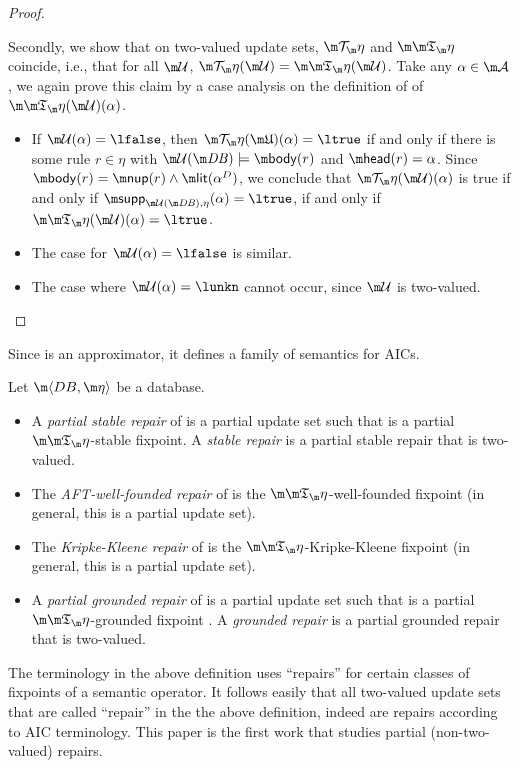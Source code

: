 \begin{proof}
\begin{itemize}
\end{itemize}

Secondly, we show that on two-valued update sets, $\Op$ and $\Ap$ coincide, i.e., that for all $\UU$, $\Op(\UU) =  \Ap(\UU)$. Take any $\alpha \in \acts$, we again prove this claim by a case analysis on the definition of of $\Ap(\UU)(\alpha)$. 
\begin{itemize}
 \item If $\UU(\alpha)=\lfalse$, then $\Op(\UUU)(\alpha)= \ltrue$ if and only if there is some rule $r\in \eta$ with $\UU(\db) \models \body(r)$ and $\head(r)=\alpha$. 
   Since $\body(r)=\nup(r)\land \litof(\alpha^D)$, we conclude that $\Op(\UU)(\alpha)$ is true if and only if $\supp_{\UU(\db),\eta}(\alpha) = \ltrue$, if and only if $\Ap(\UU)(\alpha)=\ltrue$. 
 \item The case for $\UU(\alpha)=\lfalse$ is similar. 
 \item The case where $\UU(\alpha)= \lunkn$ cannot occur, since $\UU$ is two-valued. \qedhere
\end{itemize}
\end{proof}

Since \Ap is an approximator, it defines a family of semantics for AICs. 

\begin{definition}\label{def:semantics}
 Let $\fulldb$ be a database. 
 \begin{itemize}
  \item A \emph{partial stable repair} of \fulldb is a partial update set \UUU such that \UUU is a partial $\Ap$-stable fixpoint. A \emph{stable repair} is a partial stable repair that is two-valued. 
  \item The \emph{AFT-well-founded repair} of \fulldb is the $\Ap$-well-founded fixpoint (in general, this is a partial update set). 
  \item The \emph{Kripke-Kleene repair} of \fulldb is the $\Ap$-Kripke-Kleene fixpoint (in general, this is a partial update set). 
  \item A \emph{partial grounded repair} of \fulldb is a partial update set \UUU such that \UUU is a partial $\Ap$-grounded fixpoint . A \emph{grounded repair} is a partial grounded repair that is two-valued. 
 \end{itemize}
\end{definition}

The terminology in the above definition uses ``repairs'' for certain classes of fixpoints of a semantic operator. It follows easily that  all two-valued update sets that are called ``repair'' in the the above definition, indeed are repairs according to AIC terminology. 
This paper is the first work that studies partial (non-two-valued) repairs. 
 
